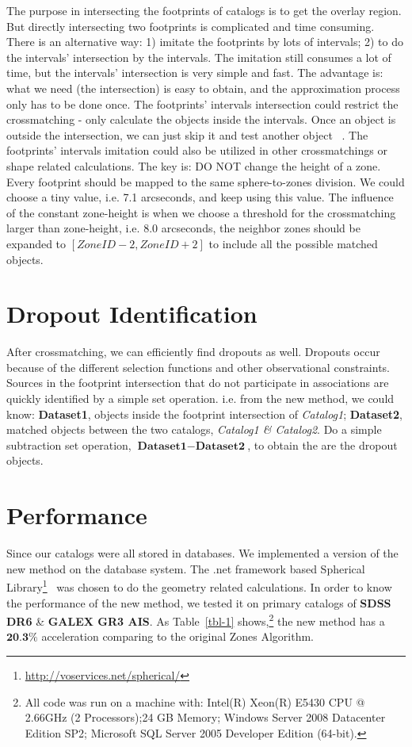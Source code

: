 The purpose in intersecting the footprints of catalogs is to get the overlay region. But directly intersecting two footprints is complicated and time consuming. There is an alternative way: 1) imitate the footprints by lots of intervals; 2) to do the intervals' intersection by the intervals. The imitation still consumes a lot of time, but the intervals' intersection is very simple and fast. The advantage is: what we need (the intersection) is easy to obtain, and the approximation process only has to be done once. The footprints' intervals intersection could restrict the crossmatching - only calculate the objects inside the intervals. Once an object is outside the intersection, we can just skip it and test another object ~\citep{dongwei}. The footprints' intervals imitation could also be utilized in other crossmatchings or shape related calculations. The key is: DO NOT change the height of a zone. Every footprint should be mapped to the same sphere-to-zones division. We could choose a tiny value, i.e. 7.1 arcseconds, and keep using this value. The influence of the constant zone-height is when we choose a threshold for the crossmatching larger than zone-height, i.e. 8.0 arcseconds, the neighbor zones should be expanded to $\left[\textit{ZoneID}-2,\textit{ZoneID}+2\right]$ to include all the possible matched objects. 

\section{Dropout Identification}
After crossmatching, we can efficiently find dropouts as well. Dropouts occur because of the different selection functions and other observational constraints. Sources in the footprint intersection that do not participate in associations are quickly identified by a simple set operation. i.e. from the new method, we could know: \textbf{Dataset1}, objects inside the footprint intersection of \textit{Catalog1}; \textbf{Dataset2}, matched objects between the two catalogs, \textit{Catalog1 \& Catalog2}. Do a simple subtraction set operation, $\textbf{Dataset1}-\textbf{Dataset2}$, to obtain the are the dropout objects.

\section{Performance}
Since our catalogs were all stored in databases. We implemented a version of the new method on the database system. The .net framework based Spherical Library\footnote{\url{http://voservices.net/spherical/}}~\citep{Budavari:2010ek, 2007cs........1163G} was chosen to do the geometry related calculations. In order to know the performance of the new method, we tested it on primary catalogs of \textbf{SDSS DR6} \& \textbf{GALEX GR3 AIS}. As Table~\ref{tbl-1} shows,\footnote{All code was run on a machine with: Intel(R) Xeon(R) E5430 CPU @ 2.66GHz (2 Processors);24 GB Memory; Windows Server 2008 Datacenter Edition SP2; Microsoft SQL Server 2005 Developer Edition (64-bit).} the new method has a $\textbf{20.3\%}$ acceleration comparing to the original Zones Algorithm.

